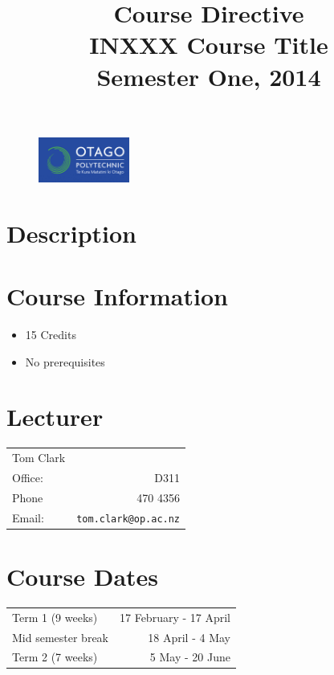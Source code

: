 \documentclass{article}
\begin{document}
\begin{figure}
\includegraphics[width=30mm]{oplogo.png}
\end{figure}

\title{Course Directive\\INXXX Course Title\\Semester One, 2014}
\date{}
\maketitle

\section*{Description}

\section*{Course Information}
\begin{itemize}
  \item 15 Credits
  \item No prerequisites
\end{itemize}

\section*{Lecturer}
\begin{tabular}{lr}

  Tom Clark &    \\
     Office: & D311 \\
     Phone & 470 4356 \\
     Email: & \texttt{tom.clark@op.ac.nz} \\
\end{tabular}

\section*{Course Dates}
\begin{tabular}{lr}
Term 1 (9 weeks) & 17 February - 17 April \\
Mid semester break & 18 April - 4 May \\
Term 2 (7 weeks) & 5 May - 20 June \\
\end{tabular}
\end{document}

